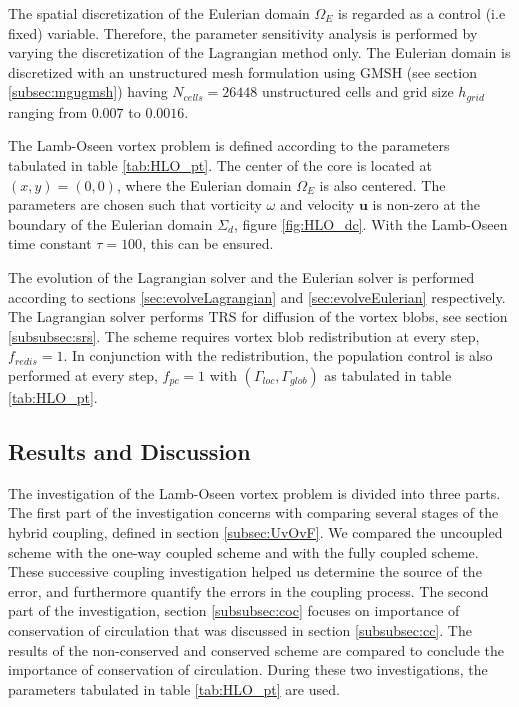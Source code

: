 The spatial discretization of the Eulerian domain $\Omega_E$ is regarded as a control (i.e fixed) variable. Therefore, the parameter sensitivity analysis is performed by varying the discretization of the Lagrangian method only. The Eulerian domain is discretized with an unstructured mesh formulation using GMSH (see section \ref{subsec:mgugmsh}) having $N_{cells} = 26448$ unstructured cells and grid size $h_{grid}$ ranging from $0.007$ to $0.0016$. 

The Lamb-Oseen vortex problem is defined according to the parameters tabulated in table \ref{tab:HLO_pt}. The center of the core is located at $(x,y)=(0,0)$, where the Eulerian domain $\Omega_E$ is also centered. The parameters are chosen such that vorticity $\omega$ and velocity $\mathbf{u}$ is non-zero at the boundary of the Eulerian domain $\Sigma_d$, figure \ref{fig:HLO_dc}. With the Lamb-Oseen time constant $\tau = 100$, this can be ensured.

The evolution of the Lagrangian solver and the Eulerian solver is performed according to sections \ref{sec:evolveLagrangian} and \ref{sec:evolveEulerian} respectively. The Lagrangian solver performs TRS for diffusion of the vortex blobs, see section \ref{subsubsec:srs}. The scheme requires vortex blob redistribution at every step, $f_{redis} = 1$. In conjunction with the redistribution, the population control is also performed at every step, $f_{pc}=1$ with $(\Gamma_{loc},\Gamma_{glob})$ as tabulated in table \ref{tab:HLO_pt}.

\subsection{Results and Discussion}

The investigation of the Lamb-Oseen vortex problem is divided into three parts. The first part of the investigation concerns with comparing several stages of the hybrid coupling, defined in section \ref{subsec:UvOvF}. We compared the uncoupled scheme with the one-way coupled scheme and with the fully coupled scheme. These successive coupling investigation helped us determine the source of the error, and furthermore quantify the errors in the coupling process. The second part of the investigation, section \ref{subsubsec:coc} focuses on importance of conservation of circulation that was discussed in section \ref{subsubsec:cc}. The results of the non-conserved and conserved scheme are compared to conclude the importance of conservation of circulation. During these two investigations, the parameters tabulated in table \ref{tab:HLO_pt} are used.

